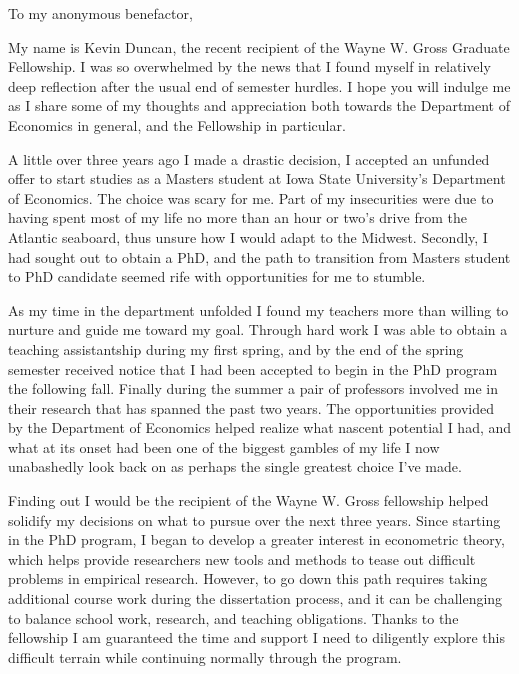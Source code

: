\documentclass{letter}
\begin{document}
\begin{letter}

\opening{To my anonymous benefactor,}

My name is Kevin Duncan, the recent recipient of the Wayne W. Gross Graduate Fellowship. I was so overwhelmed by the news that I found myself in relatively deep reflection after the usual end of semester hurdles. I hope you will indulge me as I share some of my thoughts and appreciation both towards the Department of Economics in general, and the Fellowship in particular.

A little over three years ago I made a drastic decision, I accepted an unfunded offer to start studies as a Masters student at Iowa State University's Department of Economics. The choice was scary for me. Part of my insecurities were due to having spent most of my life no more than an hour or two's drive from the Atlantic seaboard, thus unsure how I would adapt to the Midwest. Secondly, I had sought out to obtain a PhD, and the path to transition from Masters student to PhD candidate seemed rife with opportunities for me to stumble.

As my time in the department unfolded I found my teachers more than willing to nurture and guide me toward my goal. Through hard work I was able to obtain a teaching assistantship during my first spring, and by the end of the spring semester received notice that I had been accepted to begin in the PhD program the following fall. Finally during the summer a pair of professors involved me in their research that has spanned the past two years. The opportunities provided by the Department of Economics helped realize what nascent potential I had, and what at its onset had been one of the biggest gambles of my life I now unabashedly look back on as perhaps the single greatest choice I've made.

Finding out I would be the recipient of the Wayne W. Gross fellowship helped solidify my decisions on what to pursue over the next three years. Since starting in the PhD program, I began to develop a greater interest in econometric theory, which helps provide researchers new tools and methods to tease out difficult problems in empirical research. However, to go down this path requires taking additional course work during the dissertation process, and it can be challenging to balance school work, research, and teaching obligations. Thanks to the fellowship I am guaranteed the time and support I need to diligently explore this difficult terrain while continuing normally through the program.


\end{letter}
\end{document}
